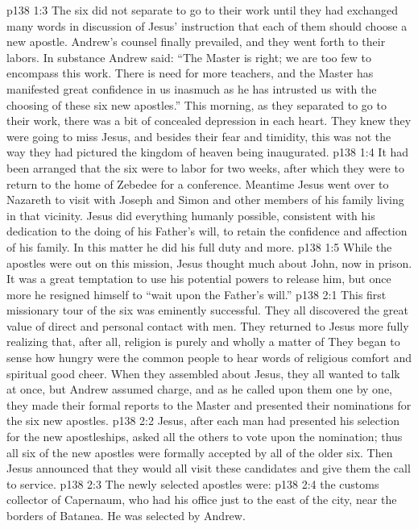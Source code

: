\vs p138 1:3 The six did not separate to go to their work until they had exchanged many words in discussion of Jesus’ instruction that each of them should choose a new apostle. Andrew’s counsel finally prevailed, and they went forth to their labors. In substance Andrew said: “The Master is right; we are too few to encompass this work. There is need for more teachers, and the Master has manifested great confidence in us inasmuch as he has intrusted us with the choosing of these six new apostles.” This morning, as they separated to go to their work, there was a bit of concealed depression in each heart. They knew they were going to miss Jesus, and besides their fear and timidity, this was not the way they had pictured the kingdom of heaven being inaugurated.
\vs p138 1:4 It had been arranged that the six were to labor for two weeks, after which they were to return to the home of Zebedee for a conference. Meantime Jesus went over to Nazareth to visit with Joseph and Simon and other members of his family living in that vicinity. Jesus did everything humanly possible, consistent with his dedication to the doing of his Father’s will, to retain the confidence and affection of his family. In this matter he did his full duty and more.
\vs p138 1:5 While the apostles were out on this mission, Jesus thought much about John, now in prison. It was a great temptation to use his potential powers to release him, but once more he resigned himself to \textcolor{ubdarkred}{“wait upon the Father’s will.”}
\vs p138 2:1 This first missionary tour of the six was eminently successful. They all discovered the great value of direct and personal contact with men. They returned to Jesus more fully realizing that, after all, religion is purely and wholly a matter of  They began to sense how hungry were the common people to hear words of religious comfort and spiritual good cheer. When they assembled about Jesus, they all wanted to talk at once, but Andrew assumed charge, and as he called upon them one by one, they made their formal reports to the Master and presented their nominations for the six new apostles.
\vs p138 2:2 Jesus, after each man had presented his selection for the new apostleships, asked all the others to vote upon the nomination; thus all six of the new apostles were formally accepted by all of the older six. Then Jesus announced that they would all visit these candidates and give them the call to service.
\vs p138 2:3 The newly selected apostles were:
\vs p138 2:4 \bibnobreakspace {} the customs collector of Capernaum, who had his office just to the east of the city, near the borders of Batanea. He was selected by Andrew.
